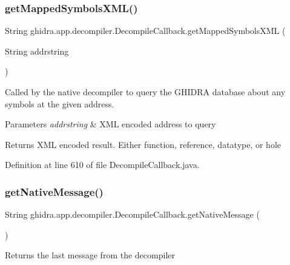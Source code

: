 \subsubsection{\texorpdfstring{getMappedSymbolsXML()}{getMappedSymbolsXML()}}
{\footnotesize\ttfamily String ghidra.\+app.\+decompiler.\+Decompile\+Callback.\+get\+Mapped\+Symbols\+X\+ML (\begin{DoxyParamCaption}\item[{String}]{addrstring }\end{DoxyParamCaption})\hspace{0.3cm}{\ttfamily [inline]}}

Called by the native decompiler to query the G\+H\+I\+D\+RA database about any symbols at the given address.


\begin{DoxyParams}{Parameters}
{\em addrstring} & X\+ML encoded address to query \\
\hline
\end{DoxyParams}
\begin{DoxyReturn}{Returns}
X\+ML encoded result. Either function, reference, datatype, or hole 
\end{DoxyReturn}


Definition at line 610 of file Decompile\+Callback.\+java.

\mbox{\label{classghidra_1_1app_1_1decompiler_1_1_decompile_callback_a10df9c572093e669a18123a5acb361eb}} 
\subsubsection{\texorpdfstring{getNativeMessage()}{getNativeMessage()}}
{\footnotesize\ttfamily String ghidra.\+app.\+decompiler.\+Decompile\+Callback.\+get\+Native\+Message (\begin{DoxyParamCaption}{ }\end{DoxyParamCaption})\hspace{0.3cm}{\ttfamily [inline]}}

\begin{DoxyReturn}{Returns}
the last message from the decompiler 
\end{DoxyReturn}


